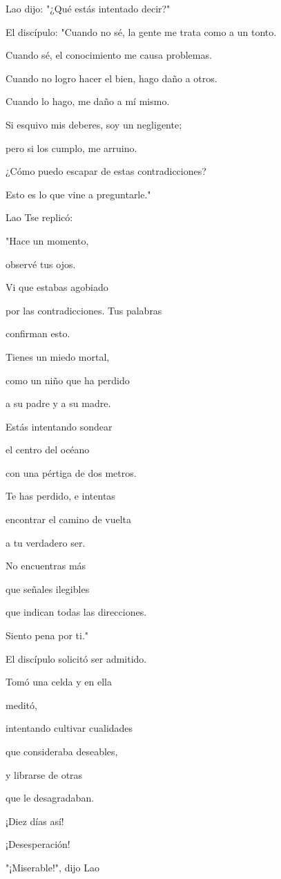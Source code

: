 Lao dijo: "¿Qué estás intentado decir?"

El discípulo: "Cuando no sé, la gente me trata como a un tonto.

Cuando sé, el conocimiento me causa problemas.

Cuando no logro hacer el bien, hago daño a otros.

Cuando lo hago, me daño a mí mismo.

Si esquivo mis deberes, soy un negligente;

pero si los cumplo, me arruino.

¿Cómo puedo escapar de estas contradicciones?

Esto es lo que vine a preguntarle."

Lao Tse replicó:

"Hace un momento,

observé tus ojos.

Vi que estabas agobiado

por las contradicciones. Tus palabras

confirman esto.

Tienes un miedo mortal,

como un niño que ha perdido

a su padre y a su madre.

Estás intentando sondear

el centro del océano

con una pértiga de dos metros.

Te has perdido, e intentas

encontrar el camino de vuelta

a tu verdadero ser.

No encuentras más

que señales ilegibles

que indican todas las direcciones.

Siento pena por ti."

El discípulo solicitó ser admitido.

Tomó una celda y en ella

meditó,

intentando cultivar cualidades

que consideraba deseables,

y librarse de otras

que le desagradaban.

¡Diez días así!

¡Desesperación!

"¡Miserable!", dijo Lao

